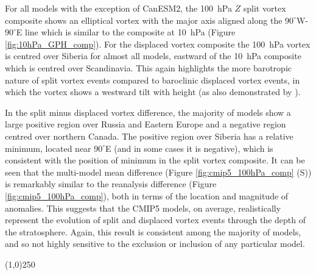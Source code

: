 For all models with the exception of CanESM2, the 100~hPa $Z$ split vortex
composite shows an elliptical vortex with the major axis aligned along the
$90^{\circ}$W-$90^{\circ}$E line which is similar to the composite at 10~hPa
(Figure \ref{fig:10hPa_GPH_comp}). For the displaced vortex composite the
100~hPa vortex is centred over Siberia for almost all models, eastward of the
10~hPa composite which is centred over Scandinavia. This again highlights the
more barotropic nature of split vortex events compared to baroclinic displaced
vortex events, in which the vortex shows a westward tilt with height (as also
demonstrated by \citet{Matthewman2009}).

In the split minus displaced vortex difference, the majority of models show a
large positive region over Russia and Eastern Europe and a negative region
centred over northern Canada. The positive region over Siberia has a relative
minimum, located near $90^{\circ}$E (and in some cases it is negative), which is
consistent with the position of minimum in the split vortex composite. It can be
seen that the multi-model mean difference (Figure \ref{fig:cmip5_100hPa_comp}
(S)) is remarkably similar to the reanalysis difference (Figure
\ref{fig:cmip5_100hPa_comp}), both in terms of the location and magnitude of
anomalies. This suggests that the CMIP5 models, on average, realistically
represent the evolution of split and displaced vortex events through the depth
of the stratosphere. Again, this result is consistent among the majority of
models, and so not highly sensitive to the exclusion or inclusion of any
particular model.
\begin{center}
\line(1,0){250}
\end{center}

